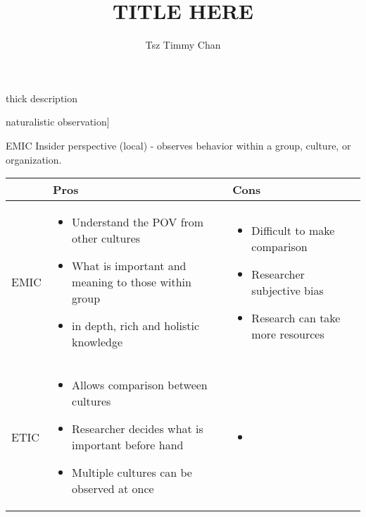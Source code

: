 \documentclass{TC}
\title{TITLE HERE}	%
\author{Tsz Timmy Chan}	%
\begin{document}
\begin{definition}
\glsdesc{thick description}
\end{definition}

\begin{definition}
\glsdesc{naturalistic observation}]
\end{definition}

EMIC
Insider perspective (local) - observes behavior within a group, culture, or organization.

\begin{tabular}{p{.75in}|p{2.25in}|p{2.25in}}
& Pros & Cons \\ \hline
EMIC & 
\begin{minipage}{2in}

\begin{itemize}
\item Understand the POV from other cultures
\item What is important and meaning to those within group
\item in depth, rich and holistic knowledge
\end{itemize}
\end{minipage}
&
\begin{minipage}{2in}
\begin{itemize}
\item Difficult to make comparison
\item Researcher subjective bias
\item Research can take more resources 
\end{itemize}
\end{minipage} \\ \hline

ETIC & 

\begin{minipage}{2in}
\begin{itemize}
\item Allows comparison between cultures
\item Researcher decides what is important before hand
\item Multiple cultures can be observed at once
\end{itemize}
\end{minipage} & 

\begin{minipage}{2in}
\begin{itemize}
\item 
\end{itemize}
\end{minipage}

\end{tabular}
\end{document}
